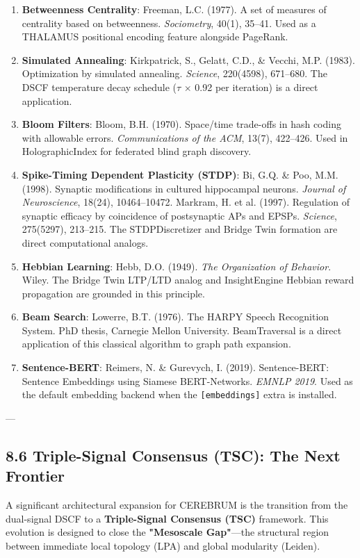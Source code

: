 \documentclass[10pt,journal,compsoc]{IEEEtran}
\begin{document}
\begin{enumerate}
\item \textbf{Betweenness Centrality}: Freeman, L.C. (1977). A set of measures of centrality based on betweenness. \textit{Sociometry}, 40(1), 35–41. Used as a THALAMUS positional encoding feature alongside PageRank.
\item \textbf{Simulated Annealing}: Kirkpatrick, S., Gelatt, C.D., \& Vecchi, M.P. (1983). Optimi\-zation by simulated annealing. \textit{Science}, 220(4598), 671–680. The DSCF temperature decay schedule ($\tau$ $\times$ 0.92 per iteration) is a direct application.
\item \textbf{Bloom Filters}: Bloom, B.H. (1970). Space/time trade-offs in hash coding with allowable errors. \textit{Commun\-ications of the ACM}, 13(7), 422–426. Used in Hologr\-aphicIndex for federated blind graph discovery.
\item \textbf{Spike-Timing Dependent Plasticity (STDP)}: Bi, G.Q. \& Poo, M.M. (1998). Synaptic modif\-ications in cultured hippocampal neurons. \textit{Journal of Neuros\-cience}, 18(24), 10464–10472. Markram, H. et al. (1997). Regulation of synaptic efficacy by coincidence of posts\-ynaptic APs and EPSPs. \textit{Science}, 275(5297), 213–215. The STDPDiscre\-tizer and Bridge Twin formation are direct compu\-tational analogs.
\item \textbf{Hebbian Learning}: Hebb, D.O. (1949). \textit{The Organi\-zation of Behavior}. Wiley. The Bridge Twin LTP/LTD analog and InsightEngine Hebbian reward propagation are grounded in this principle.
\item \textbf{Beam Search}: Lowerre, B.T. (1976). The HARPY Speech Recognition System. PhD thesis, Carnegie Mellon University. BeamTraversal is a direct application of this classical algorithm to graph path expansion.
\item \textbf{Sentence-BERT}: Reimers, N. \& Gurevych, I. (2019). Sentence-BERT: Sentence Embeddings using Siamese BERT-Networks. \textit{EMNLP 2019}. Used as the default embedding backend when the \texttt{[embeddings]} extra is installed.


\end{enumerate}
---

\subsection{8.6 Triple-Signal Consensus (TSC): The Next Frontier}

A significant archi\-tectural expansion for CEREBRUM is the transition from the dual-signal DSCF to a \textbf{Triple-Signal Consensus (TSC)} framework. This evolution is designed to close the \textbf{"Mesoscale Gap"}—the structural region between immediate local topology (LPA) and global modularity (Leiden).
\end{document}
